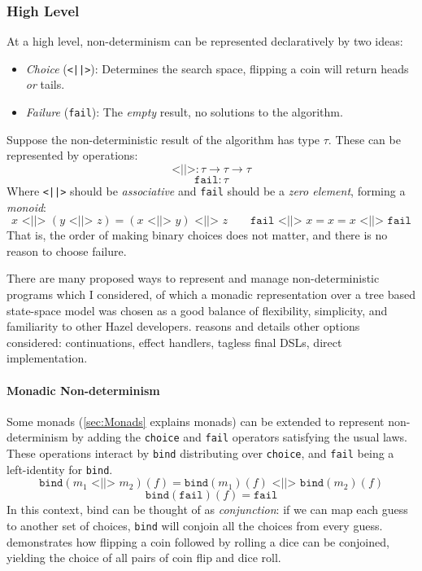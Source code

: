 \subsubsection{High Level}
At a high level, non-determinism can be represented declaratively by two ideas:
\begin{itemize}
\item \textit{Choice} (\texttt{<||>}): Determines the search space, flipping a coin will return heads \textit{or} tails.
\item \textit{Failure} (\texttt{fail}): The \textit{empty} result, no solutions to the algorithm.
\end{itemize}
Suppose the non-deterministic result of the algorithm has type $\tau$. These can be represented by operations:
\[\texttt{<||>} : \tau \to \tau \to \tau\]
\[\texttt{fail} : \tau\]
Where \texttt{<||>} should be \textit{associative} and \texttt{fail} should be a \textit{zero element}, forming a \textit{monoid}:
\[x \texttt{ <||> } (y \texttt{ <||> } z) = (x \texttt{ <||> } y) \texttt{ <||> } z \qquad \texttt{fail} \texttt{ <||> } x = x = x \texttt{ <||> } \texttt{fail}\]
That is, the order of making binary choices does not matter, and there is no reason to choose failure.

There are many proposed ways to represent and manage non-deterministic programs which I considered, of which a monadic representation over a tree based state-space model was chosen as a good balance of flexibility, simplicity, and familiarity to other Hazel developers.  reasons and details other options considered: continuations, effect handlers, tagless final DSLs, direct implementation.  

\paragraph{Monadic Non-determinism} Some monads (\cref{sec:Monads} explains monads) can be extended to represent non-determinism by adding the \texttt{choice} and \texttt{fail} operators satisfying the usual laws.
These operations interact by \texttt{bind} distributing over \texttt{choice}, and \texttt{fail} being a left-identity for \texttt{bind}.
\[\texttt{bind}(m_1 \texttt{ <||> } m_2)(f) = \texttt{bind}(m_1)(f) \texttt{ <||> } \texttt{bind}(m_2)(f)\]
\[\texttt{bind}(\texttt{fail})(f) = \texttt{fail}\]
In this context, bind can be thought of as \textit{conjunction}: if we can map each guess to another set of choices, \texttt{bind} will conjoin all the choices from every guess.  demonstrates how flipping a coin followed by rolling a dice can be conjoined, yielding the choice of all pairs of coin flip and dice roll.

